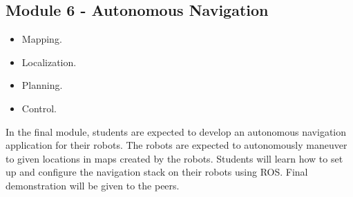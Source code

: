 \documentclass[11pt,letterpaper]{article}
\begin{document}
\subsection*{Module 6 - Autonomous Navigation}
\begin{itemize}
    \item Mapping.
    \item Localization.
    \item Planning.
    \item Control.
\end{itemize}
In the final module, students are expected to develop an autonomous navigation application for their robots. The robots are expected to autonomously maneuver to given locations in maps created by the robots. Students will learn how to set up and configure the navigation stack on their robots using ROS. Final demonstration will be given to the peers.     
\end{document}
